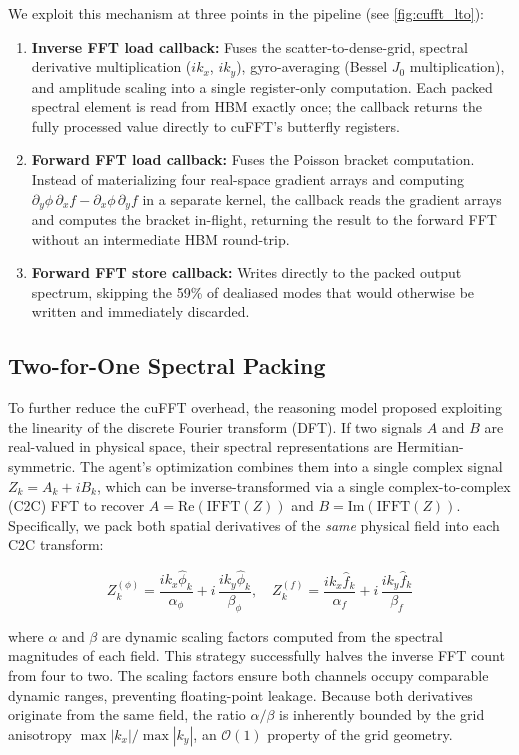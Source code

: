 \documentclass{article}
\theoremstyle{plain}
\theoremstyle{definition}
\theoremstyle{remark}
\begin{document}
We exploit this mechanism at three points in the pipeline (see \cref{fig:cufft_lto}):
\begin{enumerate}
    \item \textbf{Inverse FFT load callback:} Fuses the scatter-to-dense-grid, spectral derivative multiplication ($ik_x$, $ik_y$), gyro-averaging (Bessel $J_0$ multiplication), and amplitude scaling into a single register-only computation. Each packed spectral element is read from HBM exactly once; the callback returns the fully processed value directly to cuFFT's butterfly registers.
    \item \textbf{Forward FFT load callback:} Fuses the Poisson bracket computation. Instead of materializing four real-space gradient arrays and computing $\partial_y\phi\,\partial_x f - \partial_x\phi\,\partial_y f$ in a separate kernel, the callback reads the gradient arrays and computes the bracket in-flight, returning the result to the forward FFT without an intermediate HBM round-trip.
    \item \textbf{Forward FFT store callback:} Writes directly to the packed output spectrum, skipping the 59\% of dealiased modes that would otherwise be written and immediately discarded.
\end{enumerate}
 
\subsection{Two-for-One Spectral Packing}

To further reduce the cuFFT overhead, the reasoning model proposed exploiting the linearity of the discrete Fourier transform (DFT). If two signals $A$ and $B$ are real-valued in physical space, their spectral representations are Hermitian-symmetric. The agent's optimization combines them into a single complex signal $Z_k = A_k + i B_k$, which can be inverse-transformed via a single complex-to-complex (C2C) FFT to recover $A = \mathrm{Re}(\mathrm{IFFT}(Z))$ and $B = \mathrm{Im}(\mathrm{IFFT}(Z))$. Specifically, we pack both spatial derivatives of the \emph{same} physical field into each C2C transform:

$$Z_k^{(\phi)} = \frac{ik_x \hat\phi_k}{\alpha_\phi} + i\,\frac{ik_y \hat\phi_k}{\beta_\phi}, \quad Z_k^{(f)} = \frac{ik_x \hat f_k}{\alpha_f} + i\,\frac{ik_y \hat f_k}{\beta_f}$$

where $\alpha$ and $\beta$ are dynamic scaling factors computed from the spectral magnitudes of each field. This strategy successfully halves the inverse FFT count from four to two. The scaling factors ensure both channels occupy comparable dynamic ranges, preventing floating-point leakage. Because both derivatives originate from the same field, the ratio $\alpha/\beta$ is inherently bounded by the grid anisotropy $\max|k_x|/\max|k_y|$, an $\mathcal{O}(1)$ property of the grid geometry.
\end{document}
